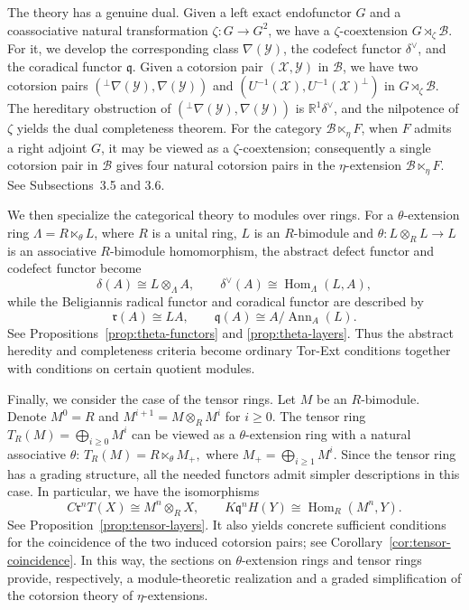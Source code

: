 \documentclass[11pt,reqno]{amsart}
\numberwithin{equation}{section}
\newcommand{\cB}{\mathcal B}
\newcommand{\cX}{\mathcal X}
\newcommand{\cY}{\mathcal Y}
\newcommand{\Hom}{\operatorname{Hom}}
\newcommand{\radf}{\mathfrak r}
\newcommand{\coradf}{\mathfrak q}
\newcommand{\Ann}{\operatorname{Ann}}
\begin{document}
The theory has a genuine dual. Given a left exact endofunctor $G$ and a coassociative natural transformation $\zeta\colon G\to G^2$, we have a
$\zeta$-coextension $G\rtimes_{\zeta}\cB$. For it, we develop the corresponding class $\nabla(\cY)$, the codefect functor $\delta^\vee$, and the coradical functor $\coradf$.
Given a cotorsion pair $(\cX,\cY)$ in $\cB$, we have two cotorsion pairs $({}^\perp\nabla(\cY), \nabla(\cY))$ and $(U^{-1}(\cX), U^{-1}(\cX)^\perp)$ in $G\rtimes_{\zeta}\cB$.
The hereditary obstruction of $({}^\perp\nabla(\cY), \nabla(\cY))$ is $\mathbb{R}^1\delta^\vee$, and the nilpotence of $\zeta$ yields the dual completeness theorem.
For the category $\cB\ltimes_\eta F$, when $F$ admits a right adjoint $G$, it may be viewed as a $\zeta$-coextension; consequently a single cotorsion pair in $\cB$ gives four natural cotorsion pairs in the $\eta$-extension $\cB\ltimes_\eta F$. See Subsections~3.5 and 3.6.

We then specialize the categorical theory to modules over rings. For a $\theta$-extension ring $\Lambda=R\ltimes_\theta L$, where $R$ is a unital ring, $L$ is an $R$-bimodule and
$\theta\colon L\otimes_R L\to L$ is an associative $R$-bimodule homomorphism,
the abstract defect functor and codefect functor become
\[
\delta(A)\cong L\otimes_\Lambda A,
\qquad
\delta^\vee(A)\cong\Hom_\Lambda(L,A),
\]
while the Beligiannis radical functor and coradical functor are described by
\[
\radf(A)\cong LA,
\qquad
\coradf(A)\cong A/\Ann_A(L).
\]
See Propositions~\ref{prop:theta-functors} and \ref{prop:theta-layers}. Thus the abstract heredity and completeness criteria become ordinary Tor-Ext conditions together with conditions on certain quotient modules.

Finally, we consider the case of the tensor rings. Let $M$ be an $R$-bimodule. Denote $M^{0}=R$ and $M^{i+1}=M\otimes_R M^{i}$ for $i\geq 0$.
The tensor ring $T_R(M) = \bigoplus_{i\geq 0}M^i$ can be viewed as a $\theta$-extension ring with a natural associative $\theta$:
$
 T_R(M) = R\ltimes_\theta M_+,
 $
where
$
M_+=\bigoplus_{i\ge1}M^i.
$
Since the tensor ring has a grading structure, all the needed functors admit simpler descriptions in this case. In particular, we have the isomorphisms
\[
C\radf^nT(X)\cong M^n\otimes_RX,
\qquad
K\coradf^nH(Y)\cong\Hom_R(M^n,Y).
\]
See Proposition~\ref{prop:tensor-layers}. It also yields concrete sufficient conditions for the coincidence of the two induced cotorsion pairs; see Corollary~\ref{cor:tensor-coincidence}. In this way, the sections on $\theta$-extension rings and tensor rings provide, respectively, a module-theoretic realization and a graded simplification of the cotorsion theory of $\eta$-extensions.
\end{document}
